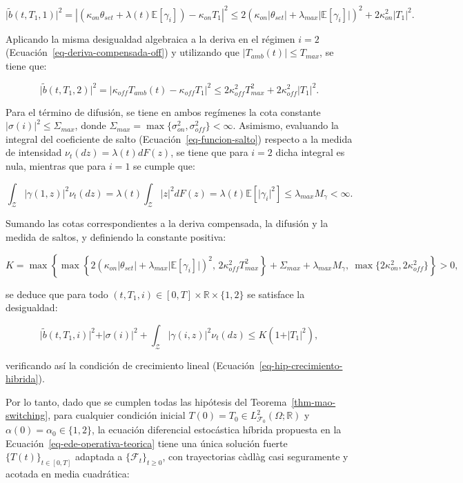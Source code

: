 \documentclass[
  spanish,
  letterpaper,
  DIV=11,
  numbers=noendperiod]{scrreprt}
\theoremstyle{plain}
\theoremstyle{plain}
\theoremstyle{plain}
\theoremstyle{definition}
\theoremstyle{remark}
\begin{document}
\[
\vert \tilde{b}(t, T_1, 1) \vert^2 = \left\vert \left( \kappa_{on}\theta_{set} + \lambda(t)\mathbb{E}[\gamma_i] \right) - \kappa_{on}T_1 \right\vert^2 \le 2\left( \kappa_{on}\vert \theta_{set} \vert + \lambda_{max}\vert \mathbb{E}[\gamma_i] \vert \right)^2 + 2\kappa_{on}^2 \vert T_1 \vert^2.
\]

Aplicando la misma desigualdad algebraica a la deriva en el régimen
\(i = 2\) (Ecuación~\ref{eq-deriva-compensada-off}) y utilizando que
\(\vert T_{amb}(t) \vert \le T_{max}\), se tiene que:

\[
\vert \tilde{b}(t, T_1, 2) \vert^2 = \vert \kappa_{off}T_{amb}(t) - \kappa_{off}T_1 \vert^2 \le 2\kappa_{off}^2 T_{max}^2 + 2\kappa_{off}^2 \vert T_1 \vert^2.
\]

Para el término de difusión, se tiene en ambos regímenes la cota
constante \(\vert \sigma(i) \vert^2 \le \Sigma_{max}\), donde
\(\Sigma_{max} = \max\{\sigma_{on}^2, \sigma_{off}^2\} < \infty\).
Asimismo, evaluando la integral del coeficiente de salto
(Ecuación~\ref{eq-funcion-salto}) respecto a la medida de intensidad
\(\nu_t(dz) = \lambda(t)dF(z)\), se tiene que para \(i = 2\) dicha
integral es nula, mientras que para \(i = 1\) se cumple que:

\[
\int_{\mathcal{Z}} \vert \gamma(1, z) \vert^2 \nu_t(dz) = \lambda(t) \int_{\mathcal{Z}} \vert z \vert^2 dF(z) = \lambda(t) \mathbb{E}[\vert \gamma_i \vert^2] \le \lambda_{max} M_\gamma < \infty.
\]

Sumando las cotas correspondientes a la deriva compensada, la difusión y
la medida de saltos, y definiendo la constante positiva:

\[
K = \max\left\{ \max\left\{ 2\left( \kappa_{on}\vert \theta_{set} \vert + \lambda_{max}\vert \mathbb{E}[\gamma_i] \vert \right)^2, \, 2\kappa_{off}^2 T_{max}^2 \right\} + \Sigma_{max} + \lambda_{max} M_\gamma, \ \max\{2\kappa_{on}^2, 2\kappa_{off}^2\} \right\} > 0,
\]

se deduce que para todo
\((t, T_1, i) \in [0, T] \times \mathbb{R} \times \{1, 2\}\) se
satisface la desigualdad:

\[
\vert \tilde{b}(t, T_1, i) \vert^2 + \vert \sigma(i) \vert^2 + \int_{\mathcal{Z}} \vert \gamma(i, z) \vert^2 \nu_t(dz) \le K\left( 1 + \vert T_1 \vert^2 \right),
\]

verificando así la condición de crecimiento lineal
(Ecuación~\ref{eq-hip-crecimiento-hibrida}).

Por lo tanto, dado que se cumplen todas las hipótesis del
Teorema~\ref{thm-mao-switching}, para cualquier condición inicial
\(T(0) = T_0 \in L^2_{\mathcal{F}_0}(\Omega; \mathbb{R})\) y
\(\alpha(0) = \alpha_0 \in \{1, 2\}\), la ecuación diferencial
estocástica híbrida propuesta en la
Ecuación~\ref{eq-ede-operativa-teorica} tiene una única solución fuerte
\(\{T(t)\}_{t \in [0, T]}\) adaptada a \(\{\mathcal{F}_t\}_{t \ge 0}\),
con trayectorias càdlàg casi seguramente y acotada en media cuadrática:
\end{document}
